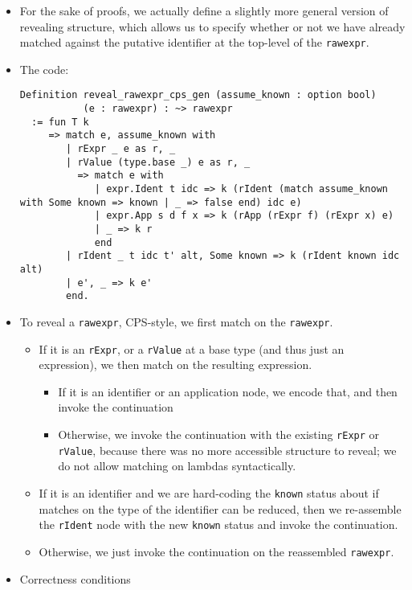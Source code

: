 \begin{itemize}
\begin{itemize}
    \begin{itemize}
    \item
      For the sake of proofs, we actually define a slightly more general
      version of revealing structure, which allows us to specify whether
      or not we have already matched against the putative identifier at
      the top-level of the \texttt{rawexpr}.
    \item
      The code:

\begin{verbatim}
Definition reveal_rawexpr_cps_gen (assume_known : option bool)
           (e : rawexpr) : ~> rawexpr
  := fun T k
     => match e, assume_known with
        | rExpr _ e as r, _
        | rValue (type.base _) e as r, _
          => match e with
             | expr.Ident t idc => k (rIdent (match assume_known with Some known => known | _ => false end) idc e)
             | expr.App s d f x => k (rApp (rExpr f) (rExpr x) e)
             | _ => k r
             end
        | rIdent _ t idc t' alt, Some known => k (rIdent known idc alt)
        | e', _ => k e'
        end.
\end{verbatim}
    \item
      To reveal a \texttt{rawexpr}, CPS-style, we first match on the
      \texttt{rawexpr}.

      \begin{itemize}
      \tightlist
      \item
        If it is an \texttt{rExpr}, or a \texttt{rValue} at a base type
        (and thus just an expression), we then match on the resulting
        expression.

        \begin{itemize}
        \tightlist
        \item
          If it is an identifier or an application node, we encode that,
          and then invoke the continuation
        \item
          Otherwise, we invoke the continuation with the existing
          \texttt{rExpr} or \texttt{rValue}, because there was no more
          accessible structure to reveal; we do not allow matching on
          lambdas syntactically.
        \end{itemize}
      \item
        If it is an identifier and we are hard-coding the \texttt{known}
        status about if matches on the type of the identifier can be
        reduced, then we re-assemble the \texttt{rIdent} node with the
        new \texttt{known} status and invoke the continuation.
      \item
        Otherwise, we just invoke the continuation on the reassembled
        \texttt{rawexpr}.
      \end{itemize}
    \item
      Correctness conditions


\end{itemize}
\end{itemize}
\end{itemize}
